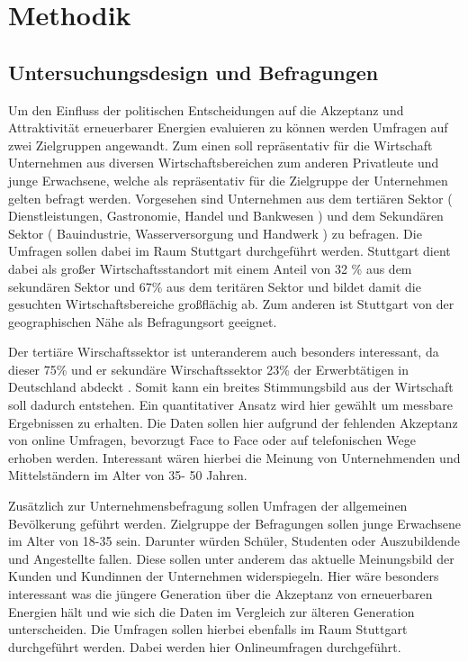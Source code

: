 \documentclass[12pt,a4paper]{article}
\begin{document}
\section*{Methodik}
\subsection*{Untersuchungsdesign und Befragungen }
Um den Einfluss der politischen Entscheidungen auf die Akzeptanz und Attraktivität 
erneuerbarer Energien evaluieren zu können werden Umfragen auf zwei Zielgruppen angewandt. 
Zum einen soll repräsentativ für die Wirtschaft Unternehmen aus diversen Wirtschaftsbereichen 
zum anderen Privatleute und junge Erwachsene, welche als repräsentativ für die Zielgruppe der Unternehmen 
gelten befragt werden. Vorgesehen sind Unternehmen aus dem tertiären Sektor 
( Dienstleistungen, Gastronomie, Handel und Bankwesen ) und dem Sekundären Sektor
( Bauindustrie, Wasserversorgung und Handwerk )  zu befragen. 
Die Umfragen sollen dabei im Raum Stuttgart durchgeführt werden. Stuttgart dient dabei als großer 
Wirtschaftsstandort mit einem Anteil von 32 \% aus dem sekundären Sektor und 67\% aus 
dem teritären Sektor \autocite{stuttgart:2023} und bildet damit die gesuchten Wirtschaftsbereiche großflächig ab. 
Zum anderen ist Stuttgart von der geographischen Nähe als Befragungsort geeignet.

Der tertiäre Wirschaftssektor ist unteranderem auch besonders interessant,
da dieser 75\% und er sekundäre Wirschaftssektor 23\% der Erwerbtätigen in Deutschland
abdeckt \autocite{workers:2022}. 
Somit kann ein breites Stimmungsbild aus der Wirtschaft soll dadurch entstehen. 
Ein quantitativer Ansatz wird hier gewählt um messbare Ergebnissen zu erhalten. 
Die Daten sollen hier aufgrund der fehlenden Akzeptanz von online Umfragen, 
bevorzugt Face to Face oder auf telefonischen Wege erhoben werden.
Interessant wären hierbei die Meinung von Unternehmenden und Mittelständern im Alter von 35- 50 Jahren.

Zusätzlich zur Unternehmensbefragung sollen Umfragen der allgemeinen Bevölkerung geführt werden. 
Zielgruppe der Befragungen sollen junge Erwachsene im Alter von 18-35 sein. Darunter würden Schüler, 
Studenten oder Auszubildende und Angestellte fallen. Diese sollen unter anderem das aktuelle Meinungsbild 
der Kunden und Kundinnen der Unternehmen widerspiegeln. Hier wäre besonders interessant was die jüngere Generation 
über die Akzeptanz von erneuerbaren Energien hält und wie sich die Daten im Vergleich zur älteren Generation unterscheiden. 
Die Umfragen sollen hierbei ebenfalls im Raum Stuttgart durchgeführt werden. Dabei werden hier Onlineumfragen durchgeführt. 
\end{document}
